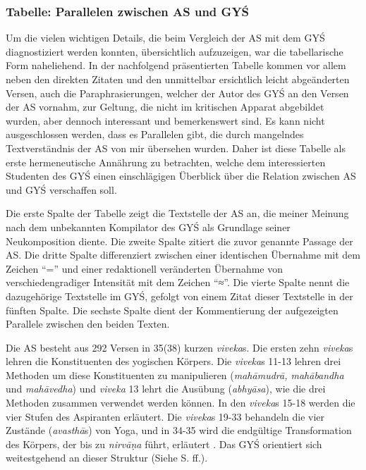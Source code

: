 \documentclass[a4paper,12pt]{article}
\begin{document}
\subsubsection{Tabelle: Parallelen zwischen AS und GYŚ}
Um die vielen wichtigen Details, die beim Vergleich der AS mit dem GYŚ diagnostiziert werden konnten, übersichtlich aufzuzeigen, war die tabellarische Form naheliehend. In der nachfolgend präsentierten Tabelle kommen vor allem neben den direkten Zitaten und den unmittelbar ersichtlich leicht abgeänderten Versen, auch die Paraphrasierungen, welcher der Autor des GYŚ an den Versen der AS vornahm, zur Geltung, die nicht im kritischen Apparat abgebildet wurden, aber dennoch interessant und bemerkenswert sind. Es kann nicht ausgeschlossen werden, dass es Parallelen gibt, die durch mangelndes Textverständnis der AS von mir übersehen wurden. Daher ist diese Tabelle als erste hermeneutische Annährung zu betrachten, welche dem interessierten Studenten des GYŚ einen einschlägigen Überblick über die Relation zwischen AS und GYŚ verschaffen soll.  

Die erste Spalte der Tabelle zeigt die Textstelle der AS an, die meiner Meinung nach dem unbekannten Kompilator des GYŚ als Grundlage seiner Neukomposition diente. Die zweite Spalte zitiert die zuvor genannte Passage der AS. Die dritte Spalte differenziert zwischen einer identischen Übernahme mit dem Zeichen ``='' und einer redaktionell veränderten Übernahme von verschiedengradiger Intensität mit dem Zeichen ``≈''. Die vierte Spalte nennt die dazugehörige Textstelle im GYŚ, gefolgt von einem Zitat dieser Textstelle in der fünften Spalte. Die sechste Spalte dient der Kommentierung der aufgezeigten Parallele zwischen den beiden Texten.

Die AS besteht aus 292 Versen in 35(38) kurzen \textit{viveka}s. Die ersten zehn \textit{viveka}s lehren die Konstituenten des yogischen Körpers. Die \textit{viveka}s 11-13 lehren drei Methoden um diese Konstituenten zu manipulieren (\textit{mahāmudrā, mahābandha} und \textit{mahāvedha}) und \textit{viveka} 13 lehrt die Ausübung (\textit{abhyāsa}), wie die drei Methoden zusammen verwendet werden können. In den \textit{viveka}s 15-18 werden die vier Stufen des Aspiranten erläutert. Die \textit{viveka}s 19-33 behandeln die vier Zustände (\textit{avasthā}s) von Yoga, und in 34-35 wird die endgültige Transformation des Körpers, der bis zu \textit{nirvāṇa} führt, erläutert \parencite[3]{mallinson2016as}. Das GYŚ orientiert sich weitestgehend an dieser Struktur (Siehe S.\pageref{tabelle} ff.). 
\end{document}
